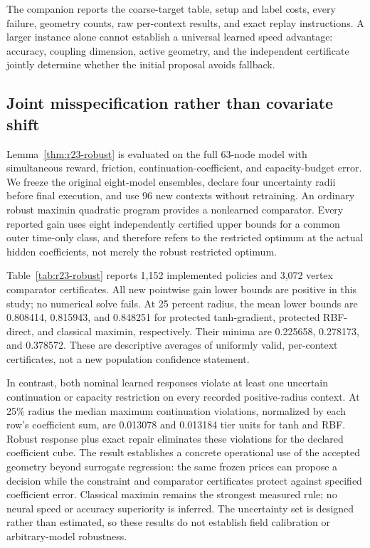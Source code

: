 \documentclass[11pt,letterpaper]{article}
\theoremstyle{definition}
\newcommand{\1}{\mathbf 1}
\begin{document}

The companion reports the coarse-target table, setup and label costs, every failure, geometry counts, raw per-context results, and exact replay instructions. A larger instance alone cannot establish a universal learned speed advantage: accuracy, coupling dimension, active geometry, and the independent certificate jointly determine whether the initial proposal avoids fallback.



\subsection{Joint misspecification rather than covariate shift}
Lemma~\ref{thm:r23-robust} is evaluated on the full 63-node model with simultaneous reward, friction, continuation-coefficient, and capacity-budget error. We freeze the original eight-model ensembles, declare four uncertainty radii before final execution, and use 96 new contexts without retraining. An ordinary robust maximin quadratic program provides a nonlearned comparator. Every reported gain uses eight independently certified upper bounds for a common outer time-only class, and therefore refers to the restricted optimum at the actual hidden coefficients, not merely the robust restricted optimum.

Table~\ref{tab:r23-robust} reports 1,152 implemented policies and 3,072 vertex comparator certificates. All new pointwise gain lower bounds are positive in this study; no numerical solve fails. At 25 percent radius, the mean lower bounds are 0.808414, 0.815943, and 0.848251 for protected tanh-gradient, protected RBF-direct, and classical maximin, respectively. Their minima are 0.225658, 0.278173, and 0.378572. These are descriptive averages of uniformly valid, per-context certificates, not a new population confidence statement.

In contrast, both nominal learned responses violate at least one uncertain continuation or capacity restriction on every recorded positive-radius context. At 25\% radius the median maximum continuation violations, normalized by each row's coefficient sum, are 0.013078 and 0.013184 tier units for tanh and RBF. Robust response plus exact repair eliminates these violations for the declared coefficient cube. The result establishes a concrete operational use of the accepted geometry beyond surrogate regression: the same frozen prices can propose a decision while the constraint and comparator certificates protect against specified coefficient error. Classical maximin remains the strongest measured rule; no neural speed or accuracy superiority is inferred. The uncertainty set is designed rather than estimated, so these results do not establish field calibration or arbitrary-model robustness.
\end{document}
